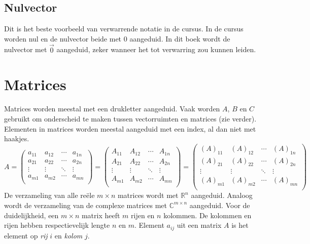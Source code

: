 \documentclass[lineaire_algebra_oplossingen.tex]{subfiles}
\begin{document}
\subsection{Nulvector}
Dit is het beste voorbeeld van verwarrende notatie in de cursus. In de cursus worden nul en de nulvector beide met $0$ aangeduid. In dit boek wordt de nulvector met $\vec{0}$ aangeduid, zeker wanneer het tot verwarring zou kunnen leiden.

\section{Matrices}
Matrices worden meestal met een drukletter aangeduid.
Vaak worden $A$, $B$ en $C$ gebruikt om onderscheid te maken tussen vectorruimten en matrices (zie verder). Elementen in matrices worden meestal aangeduid met een index, al dan niet met haakjes.
\[
A = 
\begin{pmatrix}
a_{11} & a_{12} & \cdots & a_{1n}\\
a_{21} & a_{22} & \cdots & a_{2n}\\
\vdots & \vdots & \ddots & \vdots\\
a_{m1} & a_{m2} & \cdots & a_{mn}\\
\end{pmatrix}
= 
\begin{pmatrix}
A_{11} & A_{12} & \cdots & A_{1n}\\
A_{21} & A_{22} & \cdots & A_{2n}\\
\vdots & \vdots & \ddots & \vdots\\
A_{m1} & A_{m2} & \cdots & A_{mn}\\
\end{pmatrix}
=
\begin{pmatrix}
(A)_{11} & (A)_{12} & \cdots & (A)_{1n}\\
(A)_{21} & (A)_{22} & \cdots & (A)_{2n}\\
\vdots & \vdots & \ddots & \vdots\\
(A)_{m1} & (A)_{m2} & \cdots & (A)_{mn}\\
\end{pmatrix}
\]
De verzameling van alle re\"ele $m\times n$ matrices wordt met $\mathbb{R}^n$ aangeduid.
Analoog wordt de verzameling van de complexe matrices met $\mathbb{C}^{m\times n}$ aangeduid.
Voor de duidelijkheid, een $m \times n$ matrix heeft $m$ rijen en $n$ kolommen.
De kolommen en rijen hebben respectievelijk lengte $n$ en $m$.
Element $a_{ij}$ uit een matrix $A$ is het element op \emph{rij} $i$ en \emph{kolom} $j$.
\end{document}
